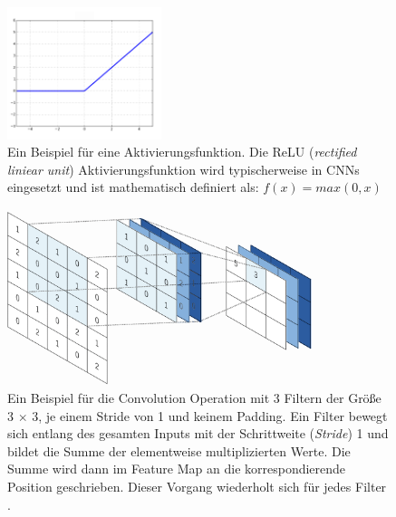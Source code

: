 \begin{figure}[H]
	\centering
	\includegraphics[width=0.4\textwidth]{images/ReLU.png}
	\caption{Ein Beispiel für eine Aktivierungsfunktion. Die ReLU (\textit{rectified liniear unit}) Aktivierungsfunktion wird typischerweise in CNNs eingesetzt und ist mathematisch definiert als: $f(x) = max(0,x)$ \cite{Goodfellow-et-al-2016} }
	\label{fig:relu}
\end{figure}

\pagebreak
\vspace*{\fill}
\begin{figure}[H]
	\centering
	\includegraphics[width=0.8\textwidth]{images/convolution_layer.png}
	\caption{Ein Beispiel für die  Convolution Operation mit 3 Filtern der Größe 3 $\times$ 3, je einem Stride von 1 und keinem Padding. Ein Filter bewegt sich entlang des gesamten Inputs mit der Schrittweite (\textit{Stride}) 1 und bildet die Summe der elementweise multiplizierten Werte. Die Summe wird dann im Feature Map an die korrespondierende Position geschrieben. Dieser Vorgang wiederholt sich für jedes Filter \cite{yamashitaConvolutionalNeuralNetworks2018}. }
	\label{fig:convolution_layer}
\end{figure}
\vspace*{\fill}
\pagebreak
